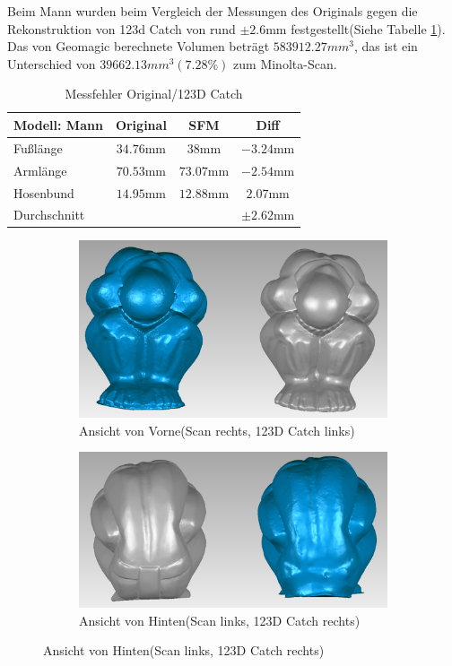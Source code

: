 \documentclass[]{article}
\begin{document}
Beim Mann wurden beim Vergleich der Messungen des Originals gegen die Rekonstruktion von 123d Catch von rund $\pm 2.6$mm festgestellt(Siehe Tabelle \ref{tab:man:errorSFM}). Das von Geomagic berechnete Volumen beträgt $583912.27mm^3$, das ist ein Unterschied von $39662.13mm^3(7.28\%)$ zum Minolta-Scan.

\begin{table}[h!]
\centering
\begin{tabular}{l | c c | c}
Modell: Mann& Original & SFM & Diff\\
\hline
Fußlänge & $34.76$mm & $38$mm & $-3.24$mm\\
Armlänge & $70.53$mm & $73.07$mm & $-2.54$mm\\
Hosenbund & $14.95$mm & $12.88$mm & $2.07$mm\\
\hline \hline
Durchschnitt & & & $\pm 2.62$mm
\end{tabular}
\caption{Messfehler Original/123D Catch}
\label{tab:man:errorSFM}
\end{table}

\begin{figure}[hbtp]
\caption{Vergleich Scan vs 123D Catch}

\begin{subfigure}{\textwidth}
	\caption{Ansicht von Vorne(Scan rechts, 123D Catch links)}
	\centering
	\includegraphics[width=\textwidth]{images/Mann_20_Comparison_Front.PNG}
\end{subfigure}

\begin{subfigure}{\textwidth}
	\caption{Ansicht von Hinten(Scan links, 123D Catch rechts)}
	\centering
	\includegraphics[width=\textwidth]{images/Mann_19_Comparison_Back.PNG}
\end{subfigure}

\end{figure}
\end{document}
